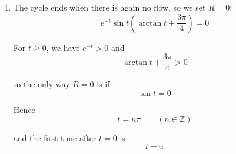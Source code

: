 \documentclass[leqno]{article}
\begin{document}
\begin{enumerate}[
  label=\textbf{\arabic*.},
  leftmargin=*,
  topsep=0pt,
  partopsep=0pt,
  parsep=0pt
]
\begin{djsSolution}
\begin{enumerate}[label=\textbf{(\alph*)}]
  Now
  \begin{align*}
  \frac{\mathrm{d}}{\mathrm{d}t}\left(\frac{e^t}{\sin t}\right)
  &= \frac{e^t}{\sin t}-\frac{e^t\cos t}{\sin^2 t} \\
  &= \frac{e^t}{\sin t}\left(1-\frac{\cos t}{\sin t}\right) \\
  &= \frac{e^t}{\sin t}(1-\cot t)
  \end{align*}

  The left-hand side is the derivative of \(\frac{e^t}{\sin t}R\), so
  \[
  \frac{\mathrm{d}}{\mathrm{d}t}\left(\frac{e^t}{\sin t}R\right)=\frac{1}{1+t^2}
  \]

  Using the standard result
  \[
  \int \frac{1}{t^2+a^2}\,\mathrm{d}t=\frac{1}{a}\arctan\left(\frac{t}{a}\right)+c
  \]

  with \(a=1\), we get
  \begin{align*}
  \frac{e^t}{\sin t}R
  &= \int \frac{1}{1+t^2}\,\mathrm{d}t \\
  &= \arctan t+c
  \end{align*}

  Therefore
  \[
  R=e^{-t}\sin t\left(\arctan t+c\right)
  \]

  Use the condition \(R(1)=\pi e^{-1}\sin 1\):
  \begin{align*}
  \pi e^{-1}\sin 1
  &= e^{-1}\sin 1\left(\arctan 1+c\right) \\
  &= e^{-1}\sin 1\left(\frac{\pi}{4}+c\right)
  \end{align*}

  Since \(e^{-1}\sin 1\neq 0\):
  \begin{align*}
  \pi &= \frac{\pi}{4}+c \\
  c &= \frac{3\pi}{4}
  \end{align*}

  So
  \[
  R=e^{-t}\sin t\left(\arctan t+\frac{3\pi}{4}\right)
  \]

  as required.

  \item The cycle ends when there is again no flow, so we set \(R=0\):
  \[
  e^{-t}\sin t\left(\arctan t+\frac{3\pi}{4}\right)=0
  \]

  For \(t\geq 0\), we have \(e^{-t}>0\) and
  \[
  \arctan t+\frac{3\pi}{4}>0
  \]

  so the only way \(R=0\) is if
  \[
  \sin t=0
  \]

  Hence
  \[
  t=n\pi \qquad (n\in\mathbb{Z})
  \]

  and the first time after \(t=0\) is
  \[
  t=\pi
  \]


\end{enumerate}
\end{djsSolution}
\end{enumerate}
\end{document}
